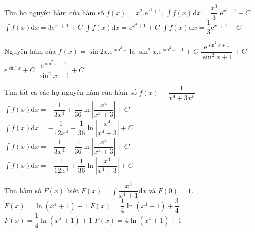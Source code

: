 \begin{ex}
	Tìm họ nguyên hàm của hàm số $ f(x)=x^2.\mathrm{e}^{x^3+1}$.
	\choice
	{$\displaystyle\int{f(x)\mathrm{d}x=}\dfrac{x^3}{3}.\mathrm{e}^{x^3+1}+C$}
	{$\displaystyle\int{f(x)\mathrm{d}x=}3\mathrm{e}^{x^3+1}+C$}
	{$\displaystyle\int{f(x)\mathrm{d}x=}{\mathrm{e}^{x^3+1}}+C$}
	{\True $\displaystyle\int{f(x)\mathrm{d}x=}\dfrac{1}{3}{\mathrm{e}^{x^3+1}}+C$}
\end{ex}
\begin{ex}
	Nguyên hàm của $ f(x)=\sin 2x.\mathrm{e}^{\sin^2x}$ là
	\choice
	{$\sin^2x.\mathrm{e}^{\sin^2x-1}+C$}
	{$\dfrac{\mathrm{e}^{\sin^2x+1}}{\sin^2x+1}+C$}
	{\True $\mathrm{e}^{\sin^2x}+C$}
	{$\dfrac{\mathrm{e}^{\sin^2x-1}}{\sin^2x-1}+C$}
\end{ex}
\begin{ex}
	Tìm tất cả các họ nguyên hàm của hàm số $ f(x)=\dfrac{1}{x^9+3x^5}$
	\choice
	{$\displaystyle\int{f(x)\mathrm{d}x=-\dfrac{1}{3x^4}+\dfrac{1}{36}\ln \left|\dfrac{x^4}{x^4+3}\right|+C}$}
	{\True $\displaystyle\int{f(x)\mathrm{d}x=-\dfrac{1}{{12}{x^4}}-\dfrac{1}{36}\ln \left|\dfrac{x^4}{x^4+3}\right|+C}$}
	{$\displaystyle\int{f(x)\mathrm{d}x=-\dfrac{1}{3x^4}-\dfrac{1}{36}\ln \left|\dfrac{x^4}{x^4+3}\right|+C}$}
	{$\displaystyle\int{f(x)\mathrm{d}x=-\dfrac{1}{{12}{x^4}}+\dfrac{1}{36}\ln \left|\dfrac{x^4}{x^4+3}\right|+C}$}
\end{ex}
\begin{ex}
	Tìm hàm số $F(x)$ biết $F(x)=\displaystyle\int{\dfrac{x^3}{x^4+1}\mathrm{d}x}$ và $F(0)=1$.
	\choice
	{$ F(x)=\ln \left(x^4+1\right)+1$}
	{$ F(x)=\dfrac{1}{4}\ln \left(x^4+1\right)+\dfrac{3}{4}$}
	{\True $ F(x)=\dfrac{1}{4}\ln \left(x^4+1\right)+1$}
	{$ F(x)=4\ln \left(x^4+1\right)+1$}
\end{ex}
